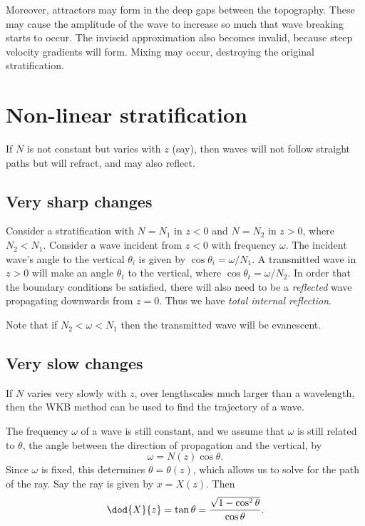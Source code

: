 Moreover, attractors may form in the deep gaps between the topography. These may
cause the amplitude of the wave to increase so much that wave breaking starts to
occur. The inviscid approximation also becomes invalid, because steep velocity
gradients will form. Mixing may occur, destroying the original stratification. 

\section{Non-linear stratification}

If $N$ is not constant but varies with $z$ (say), then waves will not follow
straight paths but will refract, and may also reflect.

\subsection{Very sharp changes}

Consider a stratification with $N = N_1$ in $z < 0$ and $N = N_2$ in $z > 0$,
where $N_2 < N_1$. Consider a wave incident from $z < 0$ with frequency
$\omega$. The incident wave's angle to the vertical $\theta_i$ is given by $\cos
\theta_i = \omega/N_1$.  A transmitted wave in $z > 0$ will make an angle
$\theta_t$ to the vertical, where $\cos\theta_t = \omega/N_2$. In order that the
boundary conditions be satisfied, there will also need to be a
\textit{reflected} wave propagating downwards from $z = 0$. Thus we have
\textit{total internal reflection}. 

Note that if $N_2 < \omega < N_1$ then the transmitted wave will be evanescent.

\subsection{Very slow changes}

If $N$ varies very slowly with $z$, over
lengthscales much larger than a wavelength, then the WKB method can be used to
find the trajectory of a wave. 

The frequency $\omega$ of a wave is still constant, and we assume that $\omega$
is still related to $\theta$, the angle between the direction of propagation and
the vertical, by
\begin{equation}
 \omega = N(z)\cos\theta.
\end{equation}
Since $\omega$ is fixed, this determines $\theta = \theta(z)$, which allows us
to solve for the path of the ray. Say the ray is given by $x = X(z)$. Then
\begin{equation}
    \dod{X}{z} = \tan \theta = \frac{\sqrt{1 - \cos^2 \theta}}{\cos\theta}.
\end{equation}

